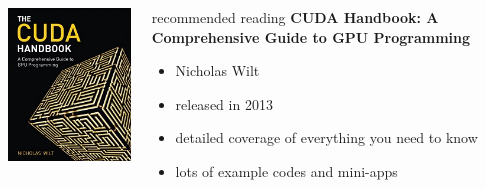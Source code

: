\begin{frame}[fragile]{}
    \begin{columns}[T]
        \begin{column}{0.4\textwidth}
            \includegraphics[width=\textwidth]{./images/CUDA-Handbook-Cover208_260.jpg}
        \end{column}

        \begin{column}{0.6\textwidth}
            \begin{info}{recommended reading}
                \textbf{\small CUDA Handbook: A Comprehensive Guide to GPU Programming}
                \begin{itemize}
                    \item  Nicholas Wilt
                    \item  released in 2013
                    \item  detailed coverage of everything you need to know
                    \item  lots of example codes and mini-apps
                \end{itemize}
            \end{info}
        \end{column}
    \end{columns}
    \begin{center}
    \end{center}
\end{frame}

